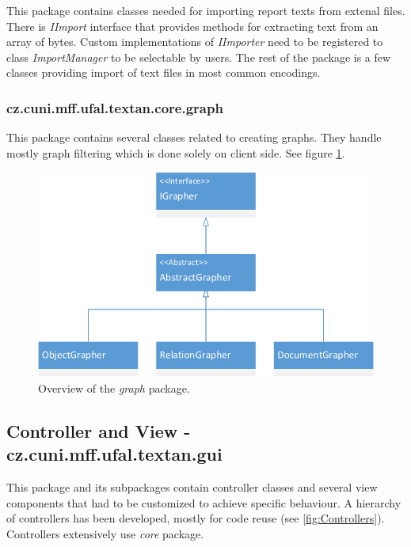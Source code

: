 This package contains classes needed for importing report texts from extenal
files. There is \emph{IImport} interface that provides methods for extracting
text from an array of bytes. Custom implementations of \emph{IImporter} need
to be registered to class \emph{ImportManager} to be selectable by users. The
rest of the package is a few classes providing import of text files in most
common encodings.

\subsubsection{cz.cuni.mff.ufal.textan.core.graph}

This package contains several classes related to creating graphs. They handle
mostly graph filtering which is done solely on client side. See figure
\ref{fig:Graph}.

\begin{figure}[!htb]
        \centering
        \includegraphics[width=\textwidth]{Images/Graph}
        \caption{Overview of the \emph{graph} package.}
        \label{fig:Graph}
\end{figure}

\subsection{Controller and View - cz.cuni.mff.ufal.textan.gui}

This package and its subpackages contain controller classes and several view
components that had to be customized to achieve specific behaviour. A hierarchy
of controllers has been developed, mostly for code reuse (see
\ref{fig:Controllers}). Controllers extensively use \emph{core} package.

